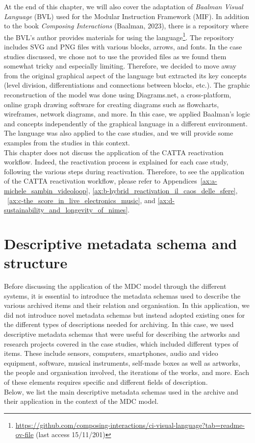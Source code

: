 At the end of this chapter, we will also cover the adaptation of \textit{Baalman Visual Language} (BVL) used for the Modular Instruction Framework (MIF). In addition to the book \textit{Composing Interactions} (Baalman, 2023), there is a repository where the BVL's author provides materials for using the language\footnote{\url{https://github.com/composing-interactions/ci-visual-language?tab=readme-ov-file} (last access 15/11/201)}. The repository includes SVG and PNG files with various blocks, arrows, and fonts. In the case studies discussed, we chose not to use the provided files as we found them somewhat tricky and especially limiting. Therefore, we decided to move away from the original graphical aspect of the language but extracted its key concepts (level division, differentiations and connections between blocks, etc.). The graphic reconstruction of the model was done using Diagrams.net, a cross-platform, online graph drawing software for creating diagrams such as flowcharts, wireframes, network diagrams, and more. In this case, we applied Baalman’s logic and concepts independently of the graphical language in a different environment.\\
The language was also applied to the case studies, and we will provide some examples from the studies in this context.\\
This chapter does not discuss the application of the CATTA reactivation workflow. Indeed, the reactivation process is explained for each case study, following the various steps during reactivation. Therefore, to see the application of the CATTA reactivation workflow, please refer to Appendices~\ref{ax:a-michele_sambin_videoloop}, \ref{ax:b-hybrid_reactivation_il_caos_delle_sfere}, ~\ref{ax:c-the_score_in_live_electronics_music}, and \ref{ax:d-sustainability_and_longevity_of_nimes}.

\section{Descriptive metadata schema and structure}
Before discussing the application of the MDC model through the different systems, it is essential to introduce the metadata schemas used to describe the various archived items and their relation and organisation. In this application, we did not introduce novel metadata schemas but instead adopted existing ones for the different types of descriptions needed for archiving. In this case, we used descriptive metadata schemas that were useful for describing the artworks and research projects covered in the case studies, which included different types of items. These include sensors, computers, smartphones, audio and video equipment, software, musical instruments, self-made boxes as well as artworks, the people and organisation involved, the iterations of the works, and more. Each of these elements requires specific and different fields of description.\\
Below, we list the main descriptive metadata schemas used in the archive and their application in the context of the MDC model.

